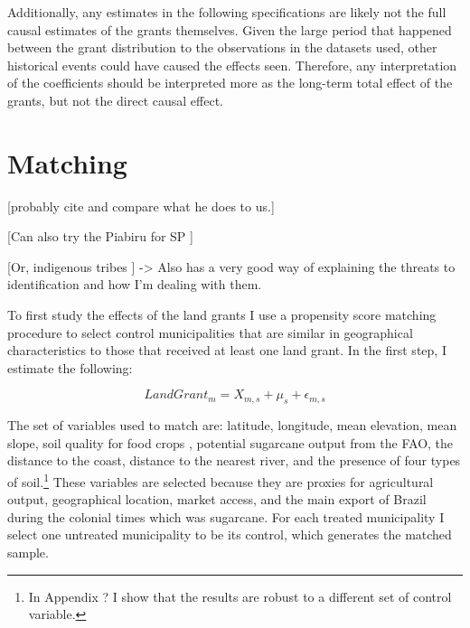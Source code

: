\documentclass{article}
\begin{document}
Additionally, any estimates in the following specifications are likely not the full causal estimates of the grants themselves. 
Given the large period that happened between the grant distribution to the observations in the datasets used, other historical events could have caused the effects seen. 
Therefore, any interpretation of the coefficients should be interpreted more as the long-term total effect of the grants, but not the direct causal effect.

\section{Matching}

[probably cite \parencite{Rocha2017-yq} and compare what he does to us.]

[Can also try the Piabiru for SP \parencite{Barsanetti2021-hp}]

[Or, indigenous tribes \parencite{Barsanetti2023-xq}] -> Also has a very good way of explaining the threats to identification and how I'm dealing with them.





To first study the effects of the land grants I use a propensity score matching procedure to select control municipalities that are similar in geographical characteristics to those that received at least one land grant. In the first step, I estimate the following:

\begin{equation}
  LandGrant_m = X_{m,s} + \mu_s + \epsilon_{m,s}
\end{equation}

The set of variables used to match are: latitude, longitude, mean elevation, mean slope, soil quality for food crops \parencite{Galor2016-ba}, potential sugarcane output from the FAO, the distance to the coast, distance to the nearest river, and the presence of four types of soil.\footnote{In Appendix ? I show that the results are robust to a different set of control variable.} 
These variables are selected because they are proxies for agricultural output, geographical location, market access, and the main export of Brazil during the colonial times which was sugarcane. 
For each treated municipality I select one untreated municipality to be its control, which generates the matched sample.
\end{document}
